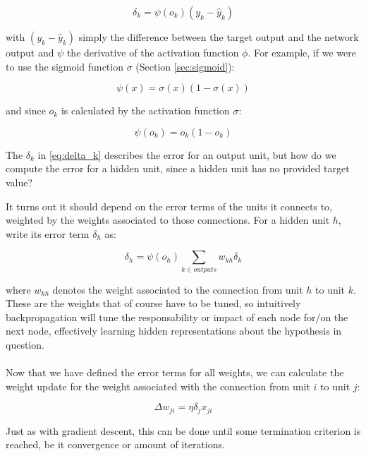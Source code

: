 \begin{equation}
  \delta_k = \psi(o_k) (y_k - \hat{y}_k)
  \label{eq:delta_k}
\end{equation}

with $(y_k - \hat{y}_k)$
simply the difference between the target output and the network output
and $\psi$ the derivative of the activation function $\phi$.
For example, if we were to use
the sigmoid function $\sigma$ (Section \ref{sec:sigmoid}):

\begin{equation}
  \psi(x) = \sigma(x) (1 - \sigma(x))
\end{equation}

and since $o_k$ is calculated by the activation function $\sigma$:

\begin{equation}
  \psi(o_k) = o_k (1 - o_k)
\end{equation}

The $\delta_k$ in \ref{eq:delta_k}
describes the error for an output unit,
but how do we compute the error for a hidden unit,
since a hidden unit has no provided target value?

It turns out it should depend on the error terms
of the units it connects to,
weighted by the weights associated to those connections.
For a hidden unit $h$, write its error term $\delta_h$ as:

\begin{equation}
  \delta_h = \psi(o_h) \sum_{k \in outputs} w_{kh}\delta_k
\end{equation}

where $w_{kh}$ denotes the weight associated to
the connection from unit $h$ to unit $k$.
These are the weights that of course have to be tuned,
so intuitively backpropagation will tune
the responsability or impact of each node for/on the next node,
effectively learning hidden representations about the hypothesis in question.

\paragraph{}
Now that we have defined the error terms for all weights,
we can calculate the weight update
for the weight associated with the connection
from unit $i$ to unit $j$:

\begin{equation}
  \Delta w_{ji} = \eta \delta_j x_{ji}
\end{equation}

Just as with gradient descent,
this can be done until some termination criterion is reached,
be it convergence or amount of iterations.

